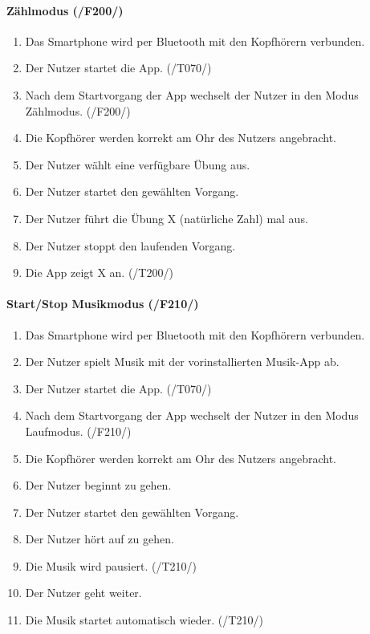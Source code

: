 \documentclass[a4paper,12pt]{article}
\begin{document}
    \paragraph{Zählmodus (/F200/)}
      \begin{enumerate}
        \item Das Smartphone wird per Bluetooth mit den Kopfhörern verbunden.
        \item Der Nutzer startet die App. (/T070/)
        \item Nach dem Startvorgang der App wechselt der Nutzer in den Modus \glqq Zählmodus\grqq . (/F200/)
        \item Die Kopfhörer werden korrekt am Ohr des Nutzers angebracht.
        \item Der Nutzer wählt eine verfügbare Übung aus. 
        \item Der Nutzer startet den gewählten \Gls{Vorgang}.
        \item Der Nutzer führt die Übung X (natürliche Zahl) mal aus.
        \item Der Nutzer stoppt den laufenden \Gls{Vorgang}.
        \item Die App zeigt X an. (/T200/)
      \end{enumerate}

    
    \paragraph{Start/Stop Musikmodus (/F210/)}
      \begin{enumerate}
        \item Das Smartphone wird per Bluetooth mit den Kopfhörern verbunden.
        \item Der Nutzer spielt Musik mit der vorinstallierten Musik-App ab.
        \item Der Nutzer startet die App. (/T070/)
        \item Nach dem Startvorgang der App wechselt der Nutzer in den Modus \glqq Laufmodus\grqq . (/F210/)
        \item Die Kopfhörer werden korrekt am Ohr des Nutzers angebracht.
        \item Der Nutzer beginnt zu gehen.
        \item Der Nutzer startet den gewählten \Gls{Vorgang}.
        \item Der Nutzer hört auf zu gehen.
        \item Die Musik wird pausiert. (/T210/)
        \item Der Nutzer geht weiter.
        \item Die Musik startet automatisch wieder. (/T210/)
      \end{enumerate}
  
\end{document}
